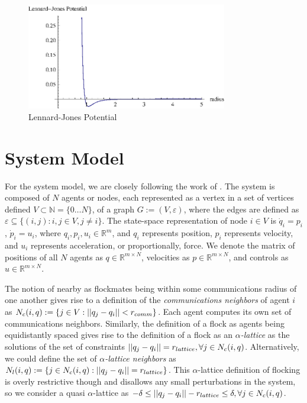 \documentclass[10pt, conference]{IEEEtran}
\begin{document}
\begin{figure}[!b]
  \begin{center}
    \includegraphics[width=3.45in]{lennardJonesPotential}
  \end{center}

  \caption{\small Lennard-Jones Potential}
  \label{fig:lennardJonesPotential}
\end{figure}

\section{System Model}
\label{sec:model}
For the system model, we are closely following the work of \cite{os2006}.
%
The system is composed of $N$ agents or nodes, each represented as a vertex in a set of vertices defined $V \subset \mathbb{N} = \{0 \ldots N \}$, of a graph $G := (V, \varepsilon)$, where the edges are defined as $\varepsilon \subseteq \{(i,j) : i,j \in V, j \neq i\}$.
%
The state-space representation of node $i \in V$ is $\dot{q}_i = p_i$, $\dot{p}_i = u_i$, where $q_i, p_i, u_i \in \mathbb{R}^m$, and $q_i$ represents position, $p_i$ represents velocity, and $u_i$ represents acceleration, or proportionally, force.
%
We denote the matrix of positions of all $N$ agents as $q \in \mathbb{R}^{m \times N}$, velocities as $p \in \mathbb{R}^{m \times N}$, and controls as $u \in \mathbb{R}^{m \times N}$.

The notion of nearby as flockmates being within some communications radius of one another gives rise to a definition of the \textit{communications neighbors} of agent $i$ as $N_c(i, q) := \{ j \in V : \lvert\lvert q_j - q_i\rvert\rvert < r_{comm}\}$.
%
Each agent computes its own set of communications neighbors.
%
Similarly, the definition of a flock as agents being equidistantly spaced gives rise to the definition of a flock as an \textit{$\alpha$-lattice} as the solutions of the set of constraints $\lvert\lvert q_j - q_i\rvert\rvert = r_{lattice}, \forall j \in N_c(i, q)$.
%
Alternatively, we could define the set of \textit{$\alpha$-lattice neighbors} as $N_l(i, q) := \{ j \in N_c(i, q) :  \lvert\lvert q_j - q_i\rvert\rvert = r_{lattice}\}$.
%
This $\alpha$-lattice definition of flocking is overly restrictive though and disallows any small perturbations in the system, so we consider a quasi $\alpha$-lattice as $-\delta \leq \lvert\lvert q_j - q_i\rvert\rvert - r_{lattice} \leq \delta, \forall j \in N_c(i, q)$.
\end{document}

